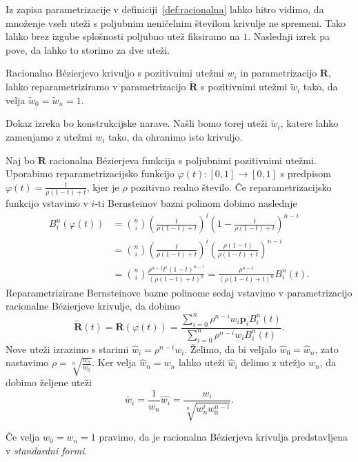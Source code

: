 \documentclass[isrm2, tisk]{fmfdelo}
\newcommand{\p}{\mathbf{p}}
\begin{document}
    Iz zapisa parametrizacije v definiciji~\ref{def:racionalna} lahko hitro vidimo, da množenje vseh uteži s poljubnim neničelnim številom krivulje ne spremeni.
    Tako lahko brez izgube splošnosti poljubno utež fiksiramo na $1$.
    Naslednji izrek pa pove, da lahko to storimo za dve uteži.
    \begin{izrek}
        \label{izrek:racionalne-utezi-1}
        Racionalno Bézierjevo krivuljo s pozitivnimi utežmi $w_i$ in parametrizacijo $\mathbf{R}$, lahko reparametriziramo v parametrizacijo $\mathbf{\tilde{R}}$ s pozitivnimi utežmi $\tilde{w}_i$ tako, da velja $\tilde{w}_0=\tilde{w}_{n}=1.$
    \end{izrek}
    \noindent Dokaz izreka bo konstrukcijske narave.
    Našli bomo torej uteži $\tilde{w}_i$, katere lahko zamenjamo z utežmi $w_i$ tako, da ohranimo isto krivuljo.
    \begin{dokaz}
        Naj bo $\mathbf{R}$ racionalna Bézierjeva funkcija s poljubnimi pozitivnimi utežmi.
        Uporabimo reparametrizacijsko funkcijo $\varphi(t):[0,1]\to[0,1]$ s predpisom $\varphi(t)=\frac{t}{\rho(1-t)+t}$, kjer je $\rho$ pozitivno realno število.
        Če reparametrizacijsko funkcijo vstavimo v $i$-ti Bernsteinov bazni polinom dobimo naslednje
        \begin{align*}
            B^n_i(\varphi(t)) &=  \binom{n}{i}\left(\frac{t}{\rho (1-t)+t}\right)^i\left(1-\frac{t}{\rho (1-t)+t}\right)^{n-i} \\
            &=  \binom{n}{i}\left(\frac{t}{\rho (1-t)+t}\right)^i\left(\frac{\rho(1-t)}{\rho (1-t)+t}\right)^{n-i} \\
            &= \binom{n}{i}\frac{\rho^{n-1}t^{i}(1-t)^{n-i}}{(\rho(1-t)+t)^n} =  \frac{\rho^{n-1}}{(\rho(1-t)+t)^n}B^n_i(t).
        \end{align*}
        Reparametrizirane Bernsteinove bazne polinome sedaj vstavimo v parametrizacijo racionalne Bézierjeve krivulje, da dobimo
        \[\mathbf{\tilde{R}}(t)=\mathbf{R}(\varphi(t)) = \frac{\sum^{n}_{i=0}\rho^{n-i}w_i\p_i B^n_i(t)}{\sum^{n}_{i=0}\rho^{n-i}w_i B^n_i(t)}. \]
        Nove uteži izrazimo s starimi $\hat{w}_i=\rho^{n-i}w_i$.
        Želimo, da bi veljalo $\hat{w}_0=\hat{w}_n$, zato nastavimo $\rho= \sqrt[n]{\frac{w_n}{w_0}}$.
        Ker velja $\hat{w}_n=w_n$ lahko uteži $\hat{w}_i$ delimo z utežjo $w_n$, da dobimo željene uteži \[\tilde{w_i}=\frac{1}{w_n}\hat{w_i} = \frac{w_i}{\sqrt[n]{w^{i}_nw_0^{n-i}}}.\]
    \end{dokaz}
    \begin{opomba}
        Če velja $w_0=w_n=1$ pravimo, da je racionalna Bézierjeva krivulja predstavljena v \textit{standardni formi}.
    \end{opomba}
\end{document}
